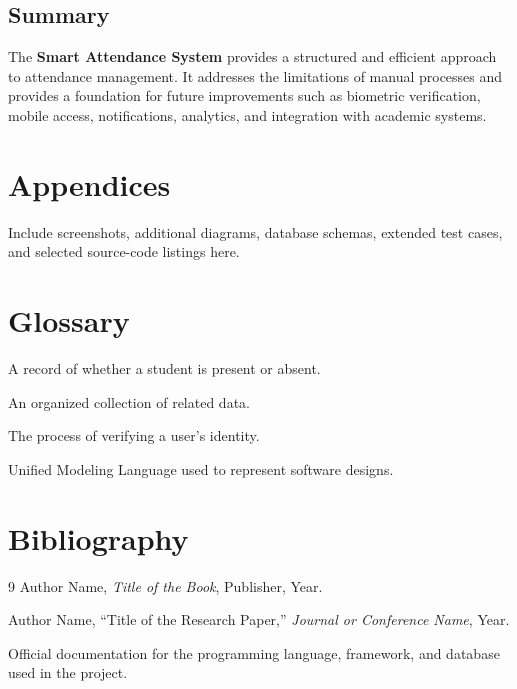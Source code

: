 \documentclass[12pt,a4paper]{report}
\newcommand{\ProjectTitleTitleCase}{Smart Attendance System}
\begin{document}
\section{Summary}
The \textbf{\ProjectTitleTitleCase} provides a structured and efficient approach to attendance management. It addresses the limitations of manual processes and provides a foundation for future improvements such as biometric verification, mobile access, notifications, analytics, and integration with academic systems.

\clearpage
\chapter*{Appendices}
Include screenshots, additional diagrams, database schemas, extended test cases, and selected source-code listings here.

\clearpage
\chapter*{Glossary}
\begin{description}[style=nextline,leftmargin=2.5cm]
  \item[Attendance] A record of whether a student is present or absent.
  \item[Database] An organized collection of related data.
  \item[Authentication] The process of verifying a user's identity.
  \item[UML] Unified Modeling Language used to represent software designs.
\end{description}

\clearpage
\chapter*{Bibliography}
\begin{thebibliography}{9}
  Author Name, \textit{Title of the Book}, Publisher, Year.

  Author Name, ``Title of the Research Paper,'' \textit{Journal or Conference Name}, Year.

  Official documentation for the programming language, framework, and database used in the project.
\end{thebibliography}
\end{document}
